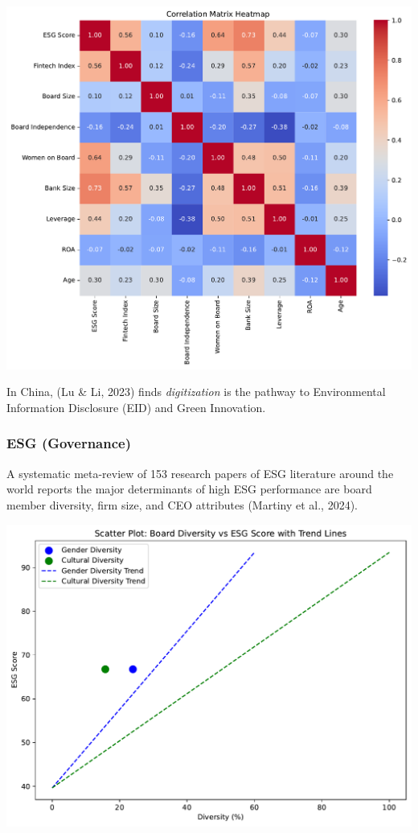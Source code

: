 \documentclass[
  letterpaper,
  DIV=11,
  numbers=noendperiod]{scrartcl}
\begin{document}
\includegraphics{_thesis_files/figure-pdf/cell-51-output-1.pdf}

In China, (Lu \& Li, 2023) finds \emph{digitization} is the pathway to
Environmental Information Disclosure (EID) and Green Innovation.

\subsubsection{ESG (Governance)}\label{esg-governance}

A systematic meta-review of 153 research papers of ESG literature around
the world reports the major determinants of high ESG performance are
board member diversity, firm size, and CEO attributes (Martiny et al.,
2024).

\includegraphics{_thesis_files/figure-pdf/cell-52-output-1.pdf}
\end{document}
